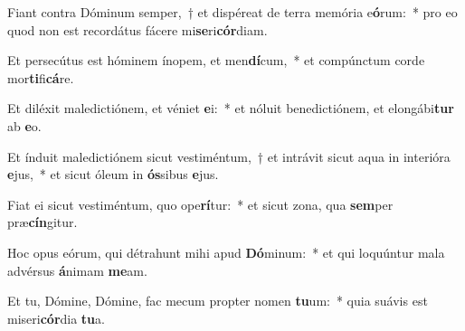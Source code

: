 \item Fiant contra Dóminum semper,~† et dispéreat de terra memória e\textbf{ó}rum:~* pro eo quod non est recordátus fácere mi\textbf{se}ri\textbf{cór}diam.
\item Et persecútus est hóminem ínopem, et men\textbf{dí}cum,~* et compúnctum corde mor\textbf{ti}fi\textbf{cá}re.
\item Et diléxit maledictiónem, et véniet \textbf{e}i:~* et nóluit benedictiónem, et elongábi\textbf{tur} ab \textbf{e}o.
\item Et índuit maledictiónem sicut vestiméntum,~† et intrávit sicut aqua in interióra \textbf{e}jus,~* et sicut óleum in \textbf{ós}sibus \textbf{e}jus.
\item Fiat ei sicut vestiméntum, quo ope\textbf{rí}tur:~* et sicut zona, qua \textbf{sem}per præ\textbf{cín}gitur.
\item Hoc opus eórum, qui détrahunt mihi apud \textbf{Dó}minum:~* et qui loquúntur mala advérsus \textbf{á}nimam \textbf{me}am.
\item Et tu, Dómine, Dómine, fac mecum propter nomen \textbf{tu}um:~* quia suávis est miseri\textbf{cór}dia \textbf{tu}a.
